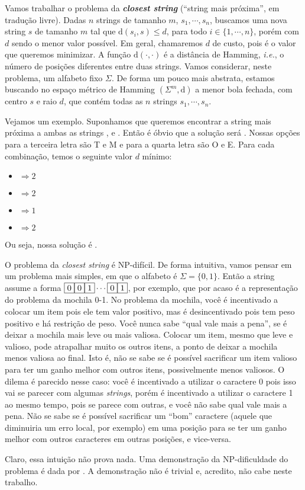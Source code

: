 Vamos trabalhar o problema da \textbf{\textit{closest string}} (``string mais próxima'', em tradução livre). Dadas $n$ strings de tamanho $m$, $s_1, \cdots, s_n$, buscamos uma nova string $s$ de tamanho $m$ tal que $\text{d}(s_i, s) \le d$, para todo $i \in \{1, \cdots, n\}$, porém com $d$ sendo o menor valor possível. Em geral, chamaremos $d$ de custo, pois é o valor que queremos minimizar. A função $\text{d}(\cdot, \cdot)$ é a distância de Hamming, \textit{i.e.}, o número de posições diferentes entre duas strings. Vamos considerar, neste problema, um alfabeto fixo $\Sigma$.
De forma um pouco mais abstrata, estamos buscando no espaço métrico de Hamming $\left(\Sigma^m, \text{d}\right)$ a menor bola fechada, com centro $s$ e raio $d$, que contém todas as $n$ strings $s_1, \cdots, s_n$.

Vejamos um exemplo. Suponhamos que queremos encontrar a string mais próxima a ambas as strings ,  e . Então é óbvio que a solução será . Nossas opções para a terceira letra são T e M e para a quarta letra são O e E. Para cada combinação, temos o seguinte valor $d$ mínimo:
\begin{itemize}
    \item {} $\Rightarrow 2$
    \item {} $\Rightarrow 2$
    \item {} $\Rightarrow 1$
    \item {} $\Rightarrow 2$
\end{itemize}
Ou seja, nossa solução é .

O problema da \textit{closest string} é NP-difícil.
De forma intuitiva, vamos pensar em um problema mais simples, em que o alfabeto é $\Sigma = \{0, 1\}$. Então a string assume a forma $\textsc{\fbox{0}}\textsc{\fbox{0}}\textsc{\fbox{1}} \cdots \textsc{\fbox{0}}\textsc{\fbox{1}}$, por exemplo, que por acaso é a representação do problema da mochila 0-1. No problema da mochila, você é incentivado a colocar um item pois ele tem valor positivo, mas é desincentivado pois tem peso positivo e há restrição de peso. Você nunca sabe ``qual vale mais a pena'', se é deixar a mochila mais leve ou mais valiosa. Colocar um item, mesmo que leve e valioso, pode atrapalhar muito os outros itens, a ponto de deixar a mochila menos valiosa ao final. Isto é, não se sabe se é possível sacrificar um item valioso para ter um ganho melhor com outros itens, possivelmente menos valiosos. O dilema é parecido nesse caso: você é incentivado a utilizar o caractere 0 pois isso vai se parecer com algumas \textit{strings}, porém é incentivado a utilizar o caractere 1 ao mesmo tempo, pois se parece com outras, e você não sabe qual vale mais a pena. Não se sabe se é possível sacrificar um ``bom'' caractere (aquele que diminuiria um erro local, por exemplo) em uma posição para se ter um ganho melhor com outros caracteres em outras posições, e vice-versa.

Claro, essa intuição não prova nada. Uma demonstração da NP-dificuldade do problema é dada por \citeauthor{frances1997covering} \cite{frances1997covering}. A demonstração não é trivial e, acredito, não cabe neste trabalho.